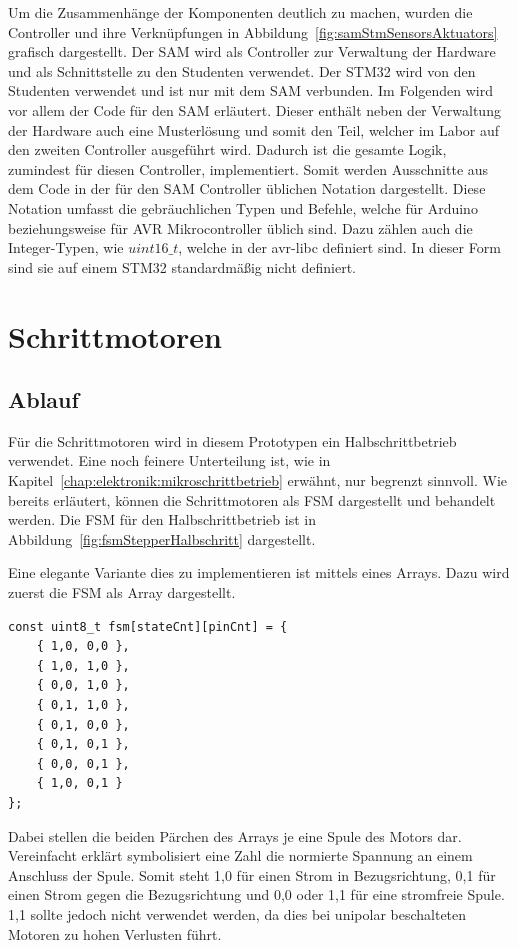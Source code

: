 Um die Zusammenhänge der Komponenten deutlich zu machen, wurden die Controller und ihre Verknüpfungen in Abbildung~\ref{fig:samStmSensorsAktuators} grafisch dargestellt.
Der SAM wird als Controller zur Verwaltung der Hardware und als Schnittstelle zu den Studenten verwendet.
Der STM32 wird von den Studenten verwendet und ist nur mit dem SAM verbunden.
Im Folgenden wird vor allem der Code für den SAM erläutert.
Dieser enthält neben der Verwaltung der Hardware auch eine Musterlösung und somit den Teil, welcher im Labor auf den zweiten Controller ausgeführt wird.
Dadurch ist die gesamte Logik, zumindest für diesen Controller, implementiert.
Somit werden Ausschnitte aus dem Code in der für den SAM Controller üblichen Notation dargestellt.
Diese Notation umfasst die gebräuchlichen Typen und Befehle, welche für Arduino beziehungsweise für AVR Mikrocontroller üblich sind.
Dazu zählen auch die Integer-Typen, wie $uint16\_t$, welche in der avr-libc definiert sind.
In dieser Form sind sie auf einem STM32 standardmäßig nicht definiert.


\section{Schrittmotoren}

\subsection{Ablauf}
\label{chap:software:schrittmotoren:ablauf}
Für die Schrittmotoren wird in diesem Prototypen ein Halbschrittbetrieb verwendet.
Eine noch feinere Unterteilung ist, wie in Kapitel~\ref{chap:elektronik:mikroschrittbetrieb} erwähnt, nur begrenzt sinnvoll.
Wie bereits erläutert, können die Schrittmotoren als FSM dargestellt und behandelt werden.
Die FSM für den Halbschrittbetrieb ist in Abbildung~\ref{fig:fsmStepperHalbschritt} dargestellt.

Eine elegante Variante dies zu implementieren ist mittels eines Arrays.
Dazu wird zuerst die FSM als Array dargestellt.

\begin{minipage}{\textwidth}
\begin{lstlisting}
const uint8_t fsm[stateCnt][pinCnt] = {
	{ 1,0, 0,0 },
	{ 1,0, 1,0 },
	{ 0,0, 1,0 },
	{ 0,1, 1,0 },
	{ 0,1, 0,0 },
	{ 0,1, 0,1 },
	{ 0,0, 0,1 },
	{ 1,0, 0,1 }
};
\end{lstlisting}
\end{minipage}


Dabei stellen die beiden Pärchen des Arrays je eine Spule des Motors dar.
Vereinfacht erklärt symbolisiert eine Zahl die normierte Spannung an einem Anschluss der Spule.
Somit steht 1,0 für einen Strom in Bezugsrichtung, 0,1 für einen Strom gegen die Bezugsrichtung und 0,0 oder 1,1 für eine stromfreie Spule.
1,1 sollte jedoch nicht verwendet werden, da dies bei unipolar beschalteten Motoren zu hohen Verlusten führt.

